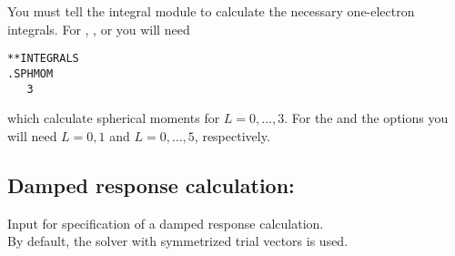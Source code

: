 
You must tell the integral module to calculate the necessary one-electron integrals.
For , , or  you will need

\begin{verbatim}
**INTEGRALS
.SPHMOM
   3
\end{verbatim}

which calculate spherical moments for $L = 0, \ldots, 3$.
For the  and the  options
you will need $L = 0, 1$ and $L = 0, \ldots, 5$, respectively.

\subsection{Damped response calculation: }
\label{sec:absorprsp}

Input for specification of a damped response
calculation.
\\
By default, the solver
with symmetrized trial vectors \cite{kauczor:2011} is used.

